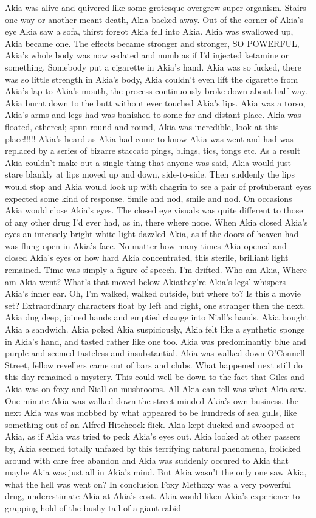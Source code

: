 \documentclass[12pt]{book}
\begin{document}
Akia was alive and quivered like some grotesque overgrew super-organism. Stairs one way or another meant death, Akia backed away. Out of the corner of Akia's eye Akia saw a sofa, thirst forgot Akia fell into Akia. Akia was swallowed up, Akia became one. The effects became stronger and stronger, SO POWERFUL, Akia's whole body was now sedated and numb as if I'd injected ketamine or something. Somebody put a cigarette in Akia's hand. Akia was so fucked, there was so little strength in Akia's body, Akia couldn't even lift the cigarette from Akia's lap to Akia's mouth, the process continuously broke down about half way. Akia burnt down to the butt without ever touched Akia's lips. Akia was a torso, Akia's arms and legs had was banished to some far and distant place. Akia was floated, ethereal; spun round and round, Akia was incredible, look at this place!!!!! Akia's heard as Akia had come to know Akia was went and had was replaced by a series of bizarre staccato pings, blings, tics, tongs etc. As a result Akia couldn't make out a single thing that anyone was said, Akia would just stare blankly at lips moved up and down, side-to-side. Then suddenly the lips would stop and Akia would look up with chagrin to see a pair of protuberant eyes expected some kind of response. Smile and nod, smile and nod. On occasions Akia would close Akia's eyes. The closed eye visuals was quite different to those of any other drug I'd ever had, as in, there where none. When Akia closed Akia's eyes an intensely bright white light dazzled Akia, as if the doors of heaven had was flung open in Akia's face. No matter how many times Akia opened and closed Akia's eyes or how hard Akia concentrated, this sterile, brilliant light remained. Time was simply a figure of speech. I'm drifted. Who am Akia, Where am Akia went? What's that moved below Akiathey're Akia's legs' whispers Akia's inner ear. Oh, I'm walked, walked outside, but where to? Is this a movie set? Extraordinary characters float by left and right, one stranger then the next. Akia dug deep, joined hands and emptied change into Niall's hands. Akia bought Akia a sandwich. Akia poked Akia suspiciously, Akia felt like a synthetic sponge in Akia's hand, and tasted rather like one too. Akia was predominantly blue and purple and seemed tasteless and insubstantial. Akia was walked down O'Connell Street, fellow revellers came out of bars and clubs. What happened next still do this day remained a mystery. This could well be down to the fact that Giles and Akia was on foxy and Niall on mushrooms. All Akia can tell was what Akia saw. One minute Akia was walked down the street minded Akia's own business, the next Akia was was mobbed by what appeared to be hundreds of sea gulls, like something out of an Alfred Hitchcock flick. Akia kept ducked and swooped at Akia, as if Akia was tried to peck Akia's eyes out. Akia looked at other passers by, Akia seemed totally unfazed by this terrifying natural phenomena, frolicked around with care free abandon and Akia was suddenly occured to Akia that maybe Akia was just all in Akia's mind. But Akia wasn't the only one saw Akia, what the hell was went on? In conclusion Foxy Methoxy was a very powerful drug, underestimate Akia at Akia's cost. Akia would liken Akia's experience to grapping hold of the bushy tail of a giant rabid 
\end{document}
